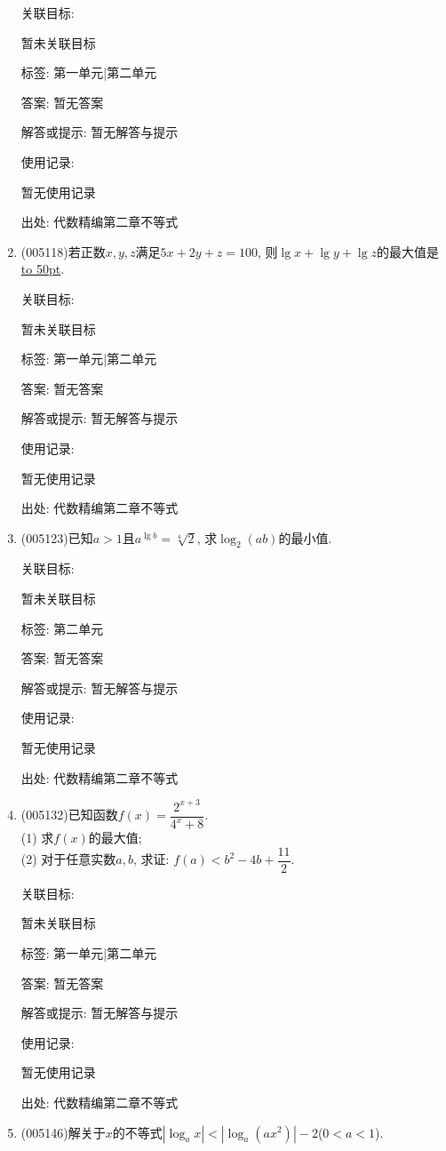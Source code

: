 \documentclass[10pt,a4paper]{article}
\newcommand{\blank}[1]{\underline{\hbox to #1pt{}}}
\begin{document}
\begin{enumerate}[1.]
关联目标:

暂未关联目标



标签: 第一单元|第二单元

答案: 暂无答案

解答或提示: 暂无解答与提示

使用记录:

暂无使用记录


出处: 代数精编第二章不等式
\item { (005118)}若正数$x,y,z$满足$5x+2y+z=100$, 则$\lg x+\lg y+\lg z$的最大值是\blank{50}.


关联目标:

暂未关联目标



标签: 第一单元|第二单元

答案: 暂无答案

解答或提示: 暂无解答与提示

使用记录:

暂无使用记录


出处: 代数精编第二章不等式
\item { (005123)}已知$a>1$且$a^{\lg b}=\sqrt[4]2$, 求$\log_2(ab)$的最小值.


关联目标:

暂未关联目标



标签: 第二单元

答案: 暂无答案

解答或提示: 暂无解答与提示

使用记录:

暂无使用记录


出处: 代数精编第二章不等式
\item { (005132)}已知函数$f(x)=\dfrac{2^{x+3}}{{4^x}+8}$.\\
(1) 求$f(x)$的最大值;\\
(2) 对于任意实数$a,b$, 求证: $f(a)<b^2-4b+\dfrac{11}2$.


关联目标:

暂未关联目标



标签: 第一单元|第二单元

答案: 暂无答案

解答或提示: 暂无解答与提示

使用记录:

暂无使用记录


出处: 代数精编第二章不等式
\item { (005146)}解关于$x$的不等式$|\log_ax|<|\log_a(ax^2)|-2$($0<a<1$).



\end{enumerate}
\end{document}
